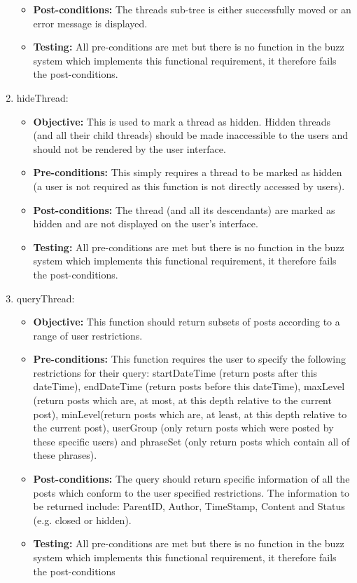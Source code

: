 \begin{enumerate}
\begin{itemize}
		\item\textbf{Post-conditions: }The threads sub-tree is either successfully moved or an error message is displayed.
		\item\textbf{Testing: } All pre-conditions are met but there is no function in the buzz system which implements this functional requirement, it therefore fails the post-conditions.
	\end{itemize}
\item hideThread:
	\begin{itemize}
		\item\textbf{Objective: } This is used to mark a thread as hidden. Hidden threads (and all their child threads) should be made inaccessible to the users and should not be rendered by the user interface.
		\item\textbf{Pre-conditions: } This simply requires a thread to be marked as hidden (a user is not required as this function is not directly accessed by users).
		\item\textbf{Post-conditions: }The thread (and all its descendants) are marked as hidden and are not displayed on the user's interface.
		\item\textbf{Testing: }  All pre-conditions are met but there is no function in the buzz system which implements this functional requirement, it therefore fails the post-conditions.
	\end{itemize}
\item queryThread:
	\begin{itemize}
		\item\textbf{Objective: } This function should return subsets of posts according to a range of user restrictions.
		\item\textbf{Pre-conditions: }  This function requires the user to specify the following restrictions for their query: startDateTime (return posts after this dateTime), endDateTime (return posts before this dateTime), maxLevel (return posts which are, at most, at this depth relative to the current post), minLevel(return posts which are, at least, at this depth relative to the current post), userGroup (only return posts which were posted by these specific users) and phraseSet (only return posts which contain all of these phrases).
		\item\textbf{Post-conditions: }The query should return specific information of all the posts which conform to the user specified restrictions. The information to be returned include: ParentID, Author, TimeStamp, Content and Status (e.g. closed or hidden).
		\item\textbf{Testing: } All pre-conditions are met but there is no function in the buzz system which implements this functional requirement, it therefore fails the post-conditions
	\end{itemize}
\end{enumerate}
